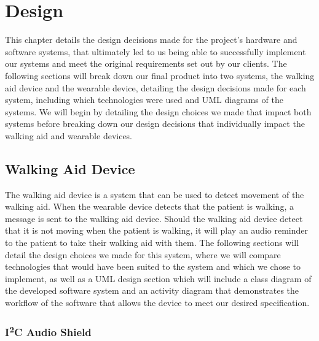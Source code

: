 \chapter{Design}
\label{ch:design}

    This chapter details the design decisions made for the project's hardware and software systems, that ultimately led to us being able to successfully implement our systems and meet the original requirements set out by our clients. The following sections will break down our final product into two systems, the walking aid device and the wearable device, detailing the design decisions made for each system, including which technologies were used and UML diagrams of the systems. We will begin by detailing the design choices we made that impact both systems before breaking down our design decisions that individually impact the walking aid and wearable devices.

    \section{Walking Aid Device}
    \label{sec:walking_aid}

        The walking aid device is a system that can be used to detect movement of the walking aid. When the wearable device detects that the patient is walking, a message is sent to the walking aid device. Should the walking aid device detect that it is not moving when the patient is walking, it will play an audio reminder to the patient to take their walking aid with them. The following sections will detail the design choices we made for this system, where we will compare technologies that would have been suited to the system and which we chose to implement, as well as a UML design section which will include a class diagram of the developed software system and an activity diagram that demonstrates the workflow of the software that allows the device to meet our desired specification.

        \subsection{I\textsuperscript{2}C Audio Shield}
        \label{subsec:i2s_audio_shield}

